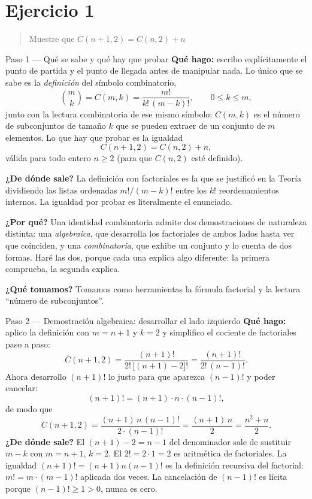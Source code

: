 \documentclass[11pt]{article}
\begin{document}
\section*{Ejercicio 1}

\begin{quote}
Muestre que $C(n+1,2)=C(n,2)+n$
\end{quote}

\begin{sol}
\begin{paso}{Paso 1 --- Qué se sabe y qué hay que probar}
\textbf{Qué hago:} escribo explícitamente el punto de partida y el punto de llegada antes de
manipular nada. Lo único que se sabe es la \emph{definición} del símbolo combinatorio,
\[
\binom{m}{k}=C(m,k)=\frac{m!}{k!\,(m-k)!},\qquad 0\le k\le m,
\]
junto con la lectura combinatoria de ese mismo símbolo: $C(m,k)$ es el número de subconjuntos
de tamaño $k$ que se pueden extraer de un conjunto de $m$ elementos. Lo que hay que probar es
la igualdad
\[
C(n+1,2)=C(n,2)+n,
\]
válida para todo entero $n\ge 2$ (para que $C(n,2)$ esté definido).

\textbf{¿De dónde sale?} La definición con factoriales es la que se justificó en la Teoría
dividiendo las listas ordenadas $m!/(m-k)!$ entre los $k!$ reordenamientos internos. La
igualdad por probar es literalmente el enunciado.

\textbf{¿Por qué?} Una identidad combinatoria admite dos demostraciones de naturaleza
distinta: una \emph{algebraica}, que desarrolla los factoriales de ambos lados hasta ver que
coinciden, y una \emph{combinatoria}, que exhibe un conjunto y lo cuenta de dos formas. Haré
las dos, porque cada una explica algo diferente: la primera comprueba, la segunda explica.

\textbf{¿Qué tomamos?} Tomamos como herramientas la fórmula factorial y la lectura ``número
de subconjuntos''.
\end{paso}

\begin{paso}{Paso 2 --- Demostración algebraica: desarrollar el lado izquierdo}
\textbf{Qué hago:} aplico la definición con $m=n+1$ y $k=2$ y simplifico el cociente de
factoriales paso a paso:
\[
C(n+1,2)=\frac{(n+1)!}{2!\,\bigl[(n+1)-2\bigr]!}=\frac{(n+1)!}{2!\,(n-1)!} .
\]
Ahora desarrollo $(n+1)!$ lo justo para que aparezca $(n-1)!$ y poder cancelar:
\[
(n+1)!=(n+1)\cdot n\cdot (n-1)!,
\]
de modo que
\[
C(n+1,2)=\frac{(n+1)\,n\,(n-1)!}{2\cdot (n-1)!}
=\frac{(n+1)\,n}{2}
=\frac{n^{2}+n}{2}.
\]
\textbf{¿De dónde sale?} El $(n+1)-2=n-1$ del denominador sale de sustituir $m-k$ con
$m=n+1$, $k=2$. El $2!=2\cdot 1=2$ es aritmética de factoriales. La igualdad
$(n+1)!=(n+1)n(n-1)!$ es la definición recursiva del factorial: $m!=m\cdot(m-1)!$ aplicada dos
veces. La cancelación de $(n-1)!$ es lícita porque $(n-1)!\ge 1>0$, nunca es cero.


\end{paso}
\end{sol}
\end{document}
